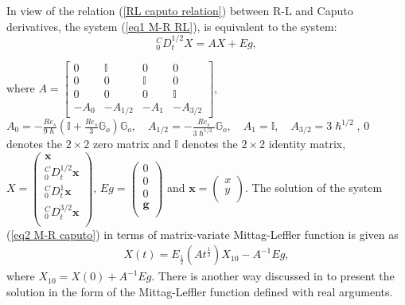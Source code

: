 \documentclass[pdflatex,sn-mathphys]{sn-jnl}%
\theoremstyle{thmstyleone}%
\theoremstyle{thmstyletwo}%
\theoremstyle{thmstylethree}%
\begin{document}
In view of the relation (\ref{RL caputo relation})  between R-L and Caputo derivatives, the system (\ref{eq1 M-R RL}), is equivalent to the system:
\begin{equation}
{ }_{0}^{C}D_{t}^{1/2}X=AX+Eg,\label{eq2 M-R caputo}
\end{equation}

where $A=\left[\begin{array}{cccc}
0 & \mathbb{I} & 0 & 0 \\ 0 & 0 & \mathbb{I} & 0 \\ 0 & 0 & 0 & \mathbb{I} \\ -A_{0} & -A_{1 / 2} & -A_{1} & -A_{3 / 2}\end{array}\right]$, \\$A_{0} = -\frac{Re_{s}}{9 \hslash}\left(\mathbb{I}+\frac{Re_{s}}{3} \mathbb{G}_{o}\right) \mathbb{G}_{o}, \quad A_{1 / 2}=-\frac{Re_{s}}{3 \hslash^{1 / 2}} \mathbb{G}_{o},\quad A_{1}=\mathbb{I},\quad
A_{3 / 2}=3 \hslash^{1 / 2}$,  $0$ denotes the $2\times2$ zero matrix and $\mathbb{I}$ denotes the $2\times2$ identity matrix,
$X= \left(
\begin{array}{c}
\mathbf{x} \\
{ }_{0}^{C}D_{t}^{1/2}\mathbf{x} \\ 
{ }_{0}^{C}D_{t}^{1}\mathbf{x} \\
{ }_{0}^{C}D_{t}^{3/2}\mathbf{x}\\
\end{array} \right)$,
$Eg=\left(
\begin{array}{c}
0 \\
0 \\ 
0 \\
\mathbf{g}\\
\end{array}
\right)$ 
 and 
$\mathbf{x}= \left(
\begin{array}{c}
 x \\
 y \\
\end{array}
\right)$.
The solution of the system (\ref{eq2 M-R caputo}) in terms of matrix-variate Mittag-Leffler function is given as
\begin{equation}
	\begin{aligned}
		X(t)=E_{\frac{1}{2}}(A t^{\frac{1}{2}}) X_{10}-A^{-1}Eg,  \label{X as X1}
	\end{aligned}
\end{equation}
where $X_{10}=X(0)+A^{-1}Eg$.
There is another way discussed in \cite{bhalekar2018singular,bhalekar2019can} to present the solution in the form of the Mittag-Leffler function defined with real arguments.
\end{document}
